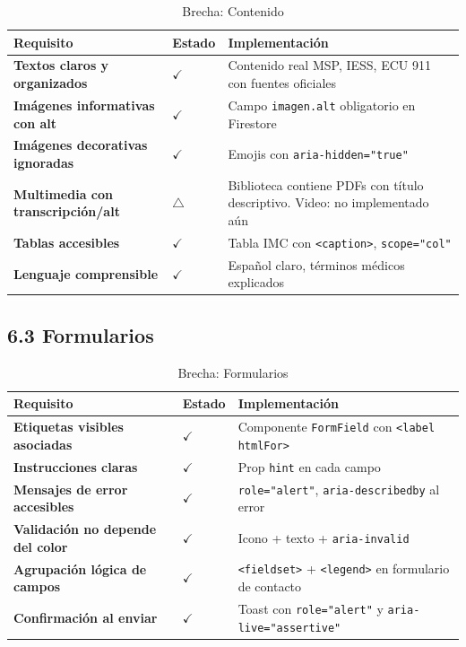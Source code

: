 \documentclass[12pt, a4paper]{article}
\newcommand{\cmark}{\textcolor{successgreen}{$\checkmark$}}
\newcommand{\wmark}{\textcolor{warningyellow}{$\triangle$}}
\begin{document}
\begin{table}[H]
\centering
\caption{Brecha: Contenido}
\small
\begin{tabular}{@{}>{\bfseries}p{5cm} >{\centering\arraybackslash}p{2cm} p{6.5cm}@{}}
\toprule
\rowcolor{royalblue!12}
\textbf{Requisito} & \textbf{Estado} & \textbf{Implementación} \\
\midrule
Textos claros y organizados & \cmark & Contenido real MSP, IESS, ECU 911 con fuentes oficiales \\
Imágenes informativas con alt & \cmark & Campo \texttt{imagen.alt} obligatorio en Firestore \\
Imágenes decorativas ignoradas & \cmark & Emojis con \texttt{aria-hidden="true"} \\
Multimedia con transcripción/alt & \wmark & Biblioteca contiene PDFs con título descriptivo. Video: no implementado aún \\
Tablas accesibles & \cmark & Tabla IMC con \texttt{<caption>}, \texttt{scope="col"} \\
Lenguaje comprensible & \cmark & Español claro, términos médicos explicados \\
\bottomrule
\end{tabular}
\end{table}

\subsection{6.3 Formularios}

\begin{table}[H]
\centering
\caption{Brecha: Formularios}
\small
\begin{tabular}{@{}>{\bfseries}p{5cm} >{\centering\arraybackslash}p{2cm} p{6.5cm}@{}}
\toprule
\rowcolor{royalblue!12}
\textbf{Requisito} & \textbf{Estado} & \textbf{Implementación} \\
\midrule
Etiquetas visibles asociadas & \cmark & Componente \texttt{FormField} con \texttt{<label htmlFor>} \\
Instrucciones claras & \cmark & Prop \texttt{hint} en cada campo \\
Mensajes de error accesibles & \cmark & \texttt{role="alert"}, \texttt{aria-describedby} al error \\
Validación no depende del color & \cmark & Icono + texto + \texttt{aria-invalid} \\
Agrupación lógica de campos & \cmark & \texttt{<fieldset>} + \texttt{<legend>} en formulario de contacto \\
Confirmación al enviar & \cmark & Toast con \texttt{role="alert"} y \texttt{aria-live="assertive"} \\
\bottomrule
\end{tabular}
\end{table}
\end{document}

